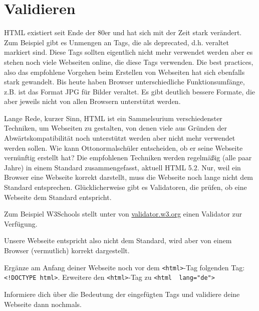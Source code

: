 \section{Validieren}
HTML existiert seit Ende der 80er und hat sich mit der Zeit stark verändert. Zum Beispiel gibt es Unmengen an Tags, die als deprecated, d.h. veraltet markiert sind. Diese Tags sollten eigentlich nicht mehr verwendet werden aber es stehen noch viele Webseiten online, die diese Tags verwenden. Die best practices, also das empfohlene Vorgehen beim Erstellen von Webseiten hat sich ebenfalls stark gewandelt. Bis heute haben Browser unterschiedliche Funktionsumfänge, z.B. ist das Format JPG für Bilder veraltet. Es gibt deutlich bessere Formate, die aber jeweils nicht von allen Browsern unterstützt werden.

Lange Rede, kurzer Sinn, HTML ist ein Sammelsurium verschiedenster Techniken, um Webseiten zu gestalten, von denen viele aus Gründen der Abwärtskompatibilität noch unterstützt werden aber nicht mehr verwendet werden sollen. Wie kann Ottonormalschüler entscheiden, ob er seine Webseite vernünftig erstellt hat? Die empfohlenen Techniken werden regelmäßig (alle paar Jahre) in einem Standard zusammengefasst, aktuell HTML 5.2. Nur, weil ein Browser eine Webseite korrekt darstellt, muss die Webseite noch lange nicht dem Standard entsprechen. Glücklicherweise gibt es Validatoren, die prüfen, ob eine Webseite dem Standard entspricht.

\begin{Exercise}[title=Prüfe deine Webseite (schueler.html in deinem Heimverzeichnis) mit einem Validator, label=Validator1]

    Zum Beispiel W3Schools stellt unter  von \href{https://validator.w3.org/#validate_by_upload}{validator.w3.org} einen Validator zur Verfügung.
\end{Exercise}

\bigskip

Unsere Webseite entspricht also nicht dem Standard, wird aber von einem Browser (vermutlich) korrekt dargestellt.

\begin{Exercise}[title=Passe deine Webseite so an{,} dass sie dem Standard entspricht., label=Validator2]
    Ergänze am Anfang deiner Webseite noch vor dem \lstinline|<html>|-Tag folgenden Tag: \lstinline|<!DOCTYPE html>|.
    Erweitere den \lstinline|<html>|-Tag zu  \lstinline|<html  lang="de">|

    Informiere dich über die Bedeutung der eingefügten Tags und validiere deine Webseite dann nochmals.
\end{Exercise}